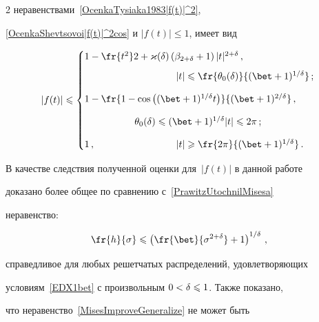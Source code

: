 \begin{multicols}{2}
неравенствами~\eqref{OcenkaTysiaka1983|f(t)|^2},

\eqref{OcenkaShevtsovoi|f(t)|^2cos} и $|f(t)|\le1$, имеет вид

$$

|f(t)|\le

\begin{cases}

 1-\fr{t^2}2+\varkappa(\d)\left(\beta_{2+\d}+

 1\right)|t|^{2+\d}\,, \\[6pt]

\hspace*{95pt} |t|\le\fr{\theta_0(\d)}{(\bet+1)^{1/\d}}\,;\hspace*{-8pt}  \\[9pt]

 1-\fr{1-\cos\left((\bet+1)^{1/\d} t\right)}

 {(\bet+1)^{2/\d}}\,,\\[9pt]

 \hspace*{52pt} \theta_0(\d)\le (\bet+1)^{1/\d}|t|  \le2\pi\,;\hspace*{-8pt}  \\[9pt]

    1\,, \hspace*{84pt} |t|\ge\fr{2\pi}{(\bet+1)^{1/\d}}\,.\hspace*{-8pt}

\end{cases}

$$



В качестве следствия полученной оценки для~$|f(t)|$ в данной работе

доказано более общее по сравнению с~\eqref{PrawitzUtochnilMisesa}

неравенство:

\begin{equation}

\label{MisesImproveGeneralize}

\fr{h}{\sigma}\le\left(\fr{\bet}{\sigma^{2+\d}}+

1\right)^{1/\d}\,,

\end{equation}

справедливое для любых решетчатых распределений, удовлетворяющих

условиям~\eqref{EDX1bet} с произвольным $0<\delta\leqslant1$. Также показано,

что неравенство~\eqref{MisesImproveGeneralize} не может быть


\end{multicols}
